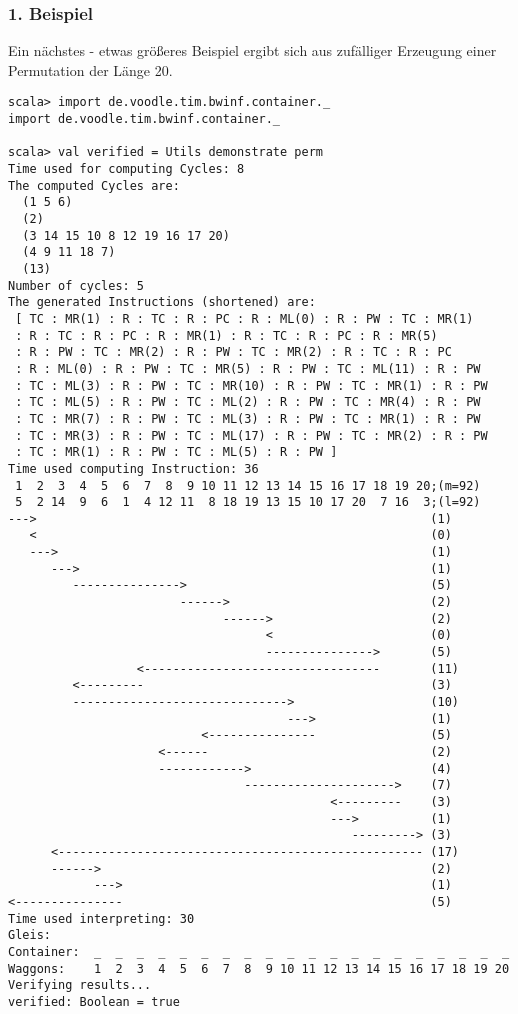 \subsubsection*{1. Beispiel}
Ein nächstes - etwas größeres Beispiel ergibt sich aus zufälliger Erzeugung einer Permutation der Länge 20.
\lstset{basicstyle=\ttfamily}
\begin{lstlisting}
scala> import de.voodle.tim.bwinf.container._                                               
import de.voodle.tim.bwinf.container._

scala> val verified = Utils demonstrate perm 
Time used for computing Cycles: 8
The computed Cycles are: 
  (1 5 6)
  (2)
  (3 14 15 10 8 12 19 16 17 20)
  (4 9 11 18 7)
  (13)
Number of cycles: 5
The generated Instructions (shortened) are: 
 [ TC : MR(1) : R : TC : R : PC : R : ML(0) : R : PW : TC : MR(1)
 : R : TC : R : PC : R : MR(1) : R : TC : R : PC : R : MR(5)
 : R : PW : TC : MR(2) : R : PW : TC : MR(2) : R : TC : R : PC
 : R : ML(0) : R : PW : TC : MR(5) : R : PW : TC : ML(11) : R : PW
 : TC : ML(3) : R : PW : TC : MR(10) : R : PW : TC : MR(1) : R : PW
 : TC : ML(5) : R : PW : TC : ML(2) : R : PW : TC : MR(4) : R : PW
 : TC : MR(7) : R : PW : TC : ML(3) : R : PW : TC : MR(1) : R : PW
 : TC : MR(3) : R : PW : TC : ML(17) : R : PW : TC : MR(2) : R : PW
 : TC : MR(1) : R : PW : TC : ML(5) : R : PW ] 
Time used computing Instruction: 36
 1  2  3  4  5  6  7  8  9 10 11 12 13 14 15 16 17 18 19 20;(m=92)
 5  2 14  9  6  1  4 12 11  8 18 19 13 15 10 17 20  7 16  3;(l=92)
--->                                                       (1)
   <                                                       (0)
   --->                                                    (1)
      --->                                                 (1)
         --------------->                                  (5)
                        ------>                            (2)
                              ------>                      (2)
                                    <                      (0)
                                    --------------->       (5)
                  <---------------------------------       (11)
         <---------                                        (3)
         ------------------------------>                   (10)
                                       --->                (1)
                           <---------------                (5)
                     <------                               (2)
                     ------------>                         (4)
                                 --------------------->    (7)
                                             <---------    (3)
                                             --->          (1)
                                                ---------> (3)
      <--------------------------------------------------- (17)
      ------>                                              (2)
            --->                                           (1)
<---------------                                           (5)
Time used interpreting: 30
Gleis: 
Container:  _  _  _  _  _  _  _  _  _  _  _  _  _  _  _  _  _  _  _  _
Waggons:    1  2  3  4  5  6  7  8  9 10 11 12 13 14 15 16 17 18 19 20
Verifying results...
verified: Boolean = true
\end{lstlisting}
